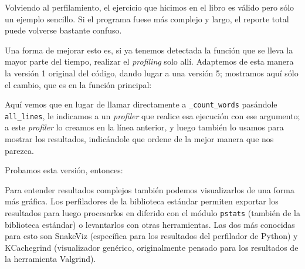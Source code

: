 Volviendo al perfilamiento, el ejercicio que hicimos en el libro es válido pero sólo un ejemplo sencillo. Si el programa fuese más complejo y largo, el reporte total puede volverse bastante confuso. 

Una forma de mejorar esto es, si ya tenemos detectada la función que se lleva la mayor parte del tiempo, realizar el \textit{profiling} solo allí. Adaptemos de esta manera la versión 1 original del código, dando lugar a una versión 5; mostramos aquí sólo el cambio, que es en la función principal:


Aquí vemos que en lugar de llamar directamente a \texttt{\_count\_words} pasándole \texttt{all\_lines}, le indicamos a un \textit{profiler} que realice esa ejecución con ese argumento; a este \textit{profiler} lo creamos en la línea anterior, y luego también lo usamos para mostrar los resultados, indicándole que ordene de la mejor manera que nos parezca.

Probamos esta versión, entonces:


Para entender resultados complejos también podemos visualizarlos de una forma más gráfica. Los perfiladores de la biblioteca estándar permiten exportar los resultados para luego procesarlos en diferido con el módulo \texttt{pstats} (también de la biblioteca estándar) o levantarlos con otras herramientas. Las dos más conocidas para esto son SnakeViz (específica para los resultados del perfilador de Python) y KCachegrind (visualizador genérico, originalmente pensado para los resultados de la herramienta Valgrind).

